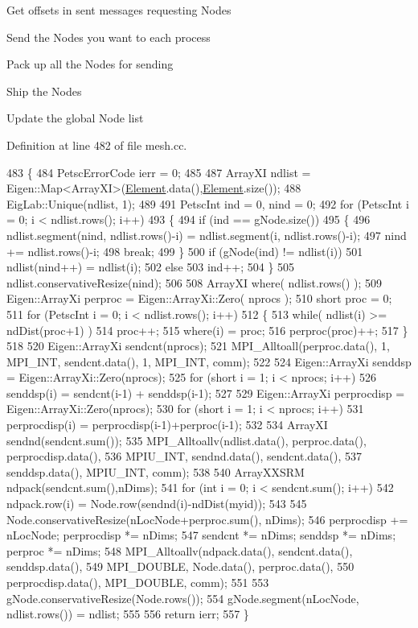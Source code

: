 Get offsets in sent messages requesting Nodes

Send the Nodes you want to each process

Pack up all the Nodes for sending

Ship the Nodes

Update the global Node list 

Definition at line 482 of file mesh.\+cc.


\begin{DoxyCode}
483 \{
484   PetscErrorCode ierr = 0;
485 
487   ArrayXI ndlist = Eigen::Map<ArrayXI>(\mbox{\hyperlink{class_element}{Element}}.data(),\mbox{\hyperlink{class_element}{Element}}.size());
488   EigLab::Unique(ndlist, 1);
489 
491   PetscInt ind = 0, nind = 0;
492   \textcolor{keywordflow}{for} (PetscInt i = 0; i < ndlist.rows(); i++)
493   \{
494       \textcolor{keywordflow}{if} (ind == gNode.size())
495       \{
496           ndlist.segment(nind, ndlist.rows()-i) = ndlist.segment(i, ndlist.rows()-i);
497           nind += ndlist.rows()-i;
498           \textcolor{keywordflow}{break};
499       \}
500       \textcolor{keywordflow}{if} (gNode(ind) != ndlist(i))
501           ndlist(nind++) = ndlist(i);
502       \textcolor{keywordflow}{else}
503           ind++;
504   \}
505   ndlist.conservativeResize(nind);
506 
508   ArrayXI where( ndlist.rows() );
509   Eigen::ArrayXi perproc = Eigen::ArrayXi::Zero( nprocs );
510   \textcolor{keywordtype}{short} proc = 0;
511   \textcolor{keywordflow}{for} (PetscInt i = 0; i < ndlist.rows(); i++)
512   \{
513       \textcolor{keywordflow}{while}( ndlist(i) >= ndDist(proc+1) )
514           proc++;
515       where(i) = proc;
516       perproc(proc)++;
517   \}
518 
520   Eigen::ArrayXi sendcnt(nprocs);
521   MPI\_Alltoall(perproc.data(), 1, MPI\_INT, sendcnt.data(), 1, MPI\_INT, comm);
522 
524   Eigen::ArrayXi senddsp = Eigen::ArrayXi::Zero(nprocs);
525   \textcolor{keywordflow}{for} (\textcolor{keywordtype}{short} i = 1; i < nprocs; i++)
526       senddsp(i) = sendcnt(i-1) + senddsp(i-1);
527 
529   Eigen::ArrayXi perprocdisp = Eigen::ArrayXi::Zero(nprocs);
530   \textcolor{keywordflow}{for} (\textcolor{keywordtype}{short} i = 1; i < nprocs; i++)
531       perprocdisp(i) = perprocdisp(i-1)+perproc(i-1);
532 
534   ArrayXI sendnd(sendcnt.sum());
535   MPI\_Alltoallv(ndlist.data(), perproc.data(), perprocdisp.data(),
536                 MPIU\_INT, sendnd.data(), sendcnt.data(),
537                 senddsp.data(), MPIU\_INT, comm);
538 
540   ArrayXXSRM ndpack(sendcnt.sum(),nDims);
541   \textcolor{keywordflow}{for} (\textcolor{keywordtype}{int} i = 0; i < sendcnt.sum(); i++)
542       ndpack.row(i) = Node.row(sendnd(i)-ndDist(myid));
543 
545   Node.conservativeResize(nLocNode+perproc.sum(), nDims);
546   perprocdisp += nLocNode; perprocdisp *= nDims;
547   sendcnt *= nDims; senddsp *= nDims; perproc *= nDims;
548   MPI\_Alltoallv(ndpack.data(), sendcnt.data(), senddsp.data(),
549                 MPI\_DOUBLE, Node.data(), perproc.data(),
550                 perprocdisp.data(), MPI\_DOUBLE, comm);
551 
553   gNode.conservativeResize(Node.rows());
554   gNode.segment(nLocNode, ndlist.rows()) = ndlist;
555 
556   \textcolor{keywordflow}{return} ierr;
557 \}
\end{DoxyCode}
